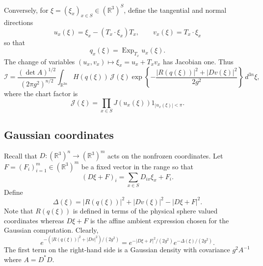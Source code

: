 \documentclass[11pt]{article}
\newcommand{\R}{\mathbb R}
\newcommand{\Exp}{\operatorname{Exp}}
\numberwithin{equation}{section}
\theoremstyle{definition}
\theoremstyle{plain}
\begin{document}
Conversely, for $\xi=(\xi_x)_{x\in S}\in(\R^3)^S$, define the tangential and normal directions
\begin{equation}
 u_x(\xi)=\xi_x-(T_x\cdot\xi_x)T_x,
 \qquad
 v_x(\xi)=T_x\cdot\xi_x
\end{equation}
so that
\begin{equation}
 q_x(\xi)=\Exp_{T_x}u_x(\xi).
\end{equation}
The change of variables $(u_x,v_x) \mapsto \xi_x=u_x+T_xv_x$ has Jacobian one.
Thus
\begin{equation}
 \mathcal I=
 \frac{(\det A)^{1/2}}{(2\pi g^2)^{n/2}}
 \int_{\R^{3n}} H(q(\xi))\,\mathcal J(\xi)
 \exp\!\left\{-\frac{|R(q(\xi))|^2+|Dv(\xi)|^2}{2g^2}\right\}
 \,d^{3n}\xi ,
\end{equation}
where the chart factor is
\begin{equation}
 \mathcal J(\xi)=\prod_{x\in S} J(u_x(\xi)) 1_{|u_x(\xi)| < \pi}.
\end{equation}

\subsection{Gaussian coordinates}

Recall that $D: (\R^{3})^n \to (\R^3)^m$ acts on the nonfrozen coordinates.
Let $F=(F_i)_{i=1}^m\in(\R^3)^m$ be a fixed vector in the range so that
\begin{equation}
 (D\xi+F)_i=\sum_{x\in S}D_{ix}\xi_x+F_i.
\end{equation}
%
Define 
\begin{equation}
 \Delta(\xi)=|R(q(\xi))|^2+|Dv(\xi)|^2-|D\xi+F|^2.
 \label{eq:delta}
\end{equation}
Note that $R(q(\xi))$ is defined in terms of the physical sphere valued coordinates
whereas $D\xi+F$ is the affine ambient expression chosen for the Gaussian computation.
%
Clearly,
\begin{equation}
 e^{-(|R(q(\xi))|^2+|Dv|^2)/(2g^2)}
 =e^{-|D\xi+F|^2/(2g^2)}e^{-\Delta(\xi)/(2g^2)}.
\end{equation}
The first term on the right-hand side is a Gaussian density with
covariance $g^2A^{-1}$ where $A=D^* D$.
\end{document}

